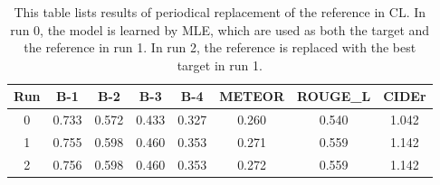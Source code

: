 \begin{table}
\small
\centering
\begin{tabular}{cccccccc}
\toprule
Run & B-1 & B-2 & B-3 & B-4 & METEOR & ROUGE\_L & CIDEr \\
\midrule
0 & 0.733 & 0.572 & 0.433 & 0.327 & 0.260 & 0.540 & 1.042 \\
1 & 0.755 & 0.598 & 0.460 & 0.353 & 0.271 & 0.559 & 1.142 \\
2 & 0.756 & 0.598 & 0.460 & 0.353 & 0.272 & 0.559 & 1.142 \\
\bottomrule
\end{tabular}
\vspace{1mm}
\caption{\small This table lists results of periodical replacement of the reference in CL.
In run 0, the model is learned by MLE,
which are used as both the target and the reference in run 1.
In run 2, the reference is replaced with the best target in run 1.}
\label{tab:periodic}
\vspace{-5mm}
\end{table}
